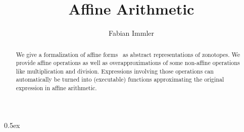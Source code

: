 \documentclass[11pt,a4paper]{article}
\begin{document}
\title{Affine Arithmetic}
\author{Fabian Immler}
\maketitle

\begin{abstract}

We give a formalization of affine forms~\cite{Stolfi2004,Girard2005} as abstract
representations of zonotopes. We provide affine operations as well as overapproximations of some
non-affine operations like multiplication and division. Expressions involving those operations can
automatically be turned into (executable) functions approximating the original expression in
affine arithmetic.

\end{abstract}

\tableofcontents

\parindent 0pt\parskip 0.5ex





\end{document}
